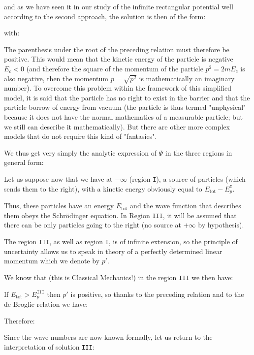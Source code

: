 	and as we have seen it in our study of the infinite rectangular potential well according to the second approach, the solution is then of the form:
	
	with:
	
	\begin{tcolorbox}[title=Remark,colframe=black,arc=10pt]
	The parenthesis under the root of the preceding relation must therefore be positive. This would mean that the kinetic energy of the particle is negative $E_c<0$ (and therefore the square of the momentum of the particle $p^2=2mE_c$ is also negative, then the momentum $p=\sqrt{p^2}$ is mathematically an
imaginary number). To overcome this problem within the framework of this simplified model, it is said that the particle has no right to exist in the barrier and that the particle borrow of energy from vacuum (the particle is thus termed "unphysical" because it does not have the normal mathematics of a
measurable particle; but we still can describe it mathematically). But there are other more complex models that do not require this kind of "fantasies".
	\end{tcolorbox}
	We thus get very simply the analytic expression of $\Psi$ in the three regions in general form:
	
	Let us suppose now that we have at $-\infty$ (region \texttt{I}), a source of particles (which sends them to the right), with a kinetic energy obviously equal to $E_{\text{tot}}-E_{p}^{\texttt{I}}$.
	
	Thus, these particles have an energy $E_\text{tot}$ and the wave function that describes them obeys the Schrödinger equation. In Region \texttt{III}, it will be assumed that there can be only particles going to the right (no source at $+\infty$ by hypothesis).

	The region \texttt{III}, as well as region \texttt{I}, is of infinite extension, so the principle of uncertainty allows us to speak in theory of a perfectly determined linear momentum which we denote by $p'$.

	We know that (this is Classical Mechanics!) in the region \texttt{III} we then have:
	
	If $E_\text{tot}>E_p^{\texttt{III}}$ then $p'$ is positive, so thanks to the preceding relation and to the de Broglie relation we have:
	
	Therefore:
	
	Since the wave numbers are now known formally, let us return to the interpretation of solution \texttt{III}:
	
